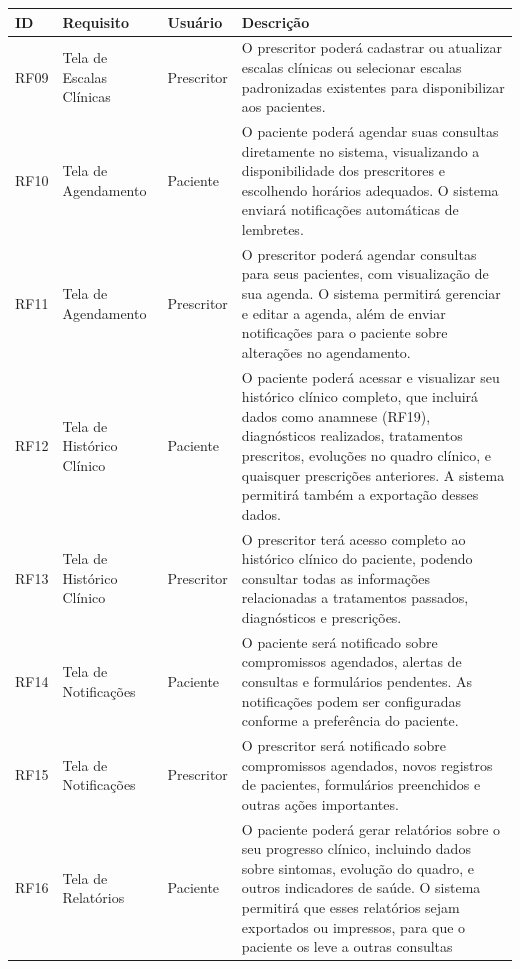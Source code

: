 \href{}{}\documentclass[12pt,portuguese,oneside]{article}
\begin{document}
\begin{table}[H]
\centering
{}
\begin{tabularx}{\textwidth}{|>{\raggedright\arraybackslash}p{1cm}|>{\raggedright\arraybackslash}p{3cm}|>{\raggedright\arraybackslash}p{2cm}|>{\raggedright\arraybackslash}X|}
\hline
\rowcolor{gray!20}
\textbf{ID} & \textbf{Requisito} & \textbf{Usuário} & \textbf{Descrição}\\
\hline
RF09 & Tela de Escalas Clínicas & Prescritor & O prescritor poderá cadastrar ou atualizar escalas clínicas ou selecionar escalas padronizadas existentes para disponibilizar aos pacientes.\\
\hline
RF10 & Tela de Agendamento & Paciente & O paciente poderá agendar suas consultas diretamente no sistema, visualizando a disponibilidade dos prescritores e escolhendo horários adequados. O sistema enviará notificações automáticas de lembretes.\\
\hline
RF11 & Tela de Agendamento & Prescritor & O prescritor poderá agendar consultas para seus pacientes, com visualização de sua agenda. O sistema permitirá gerenciar e editar a agenda, além de enviar notificações para o paciente sobre alterações no agendamento.\\
\hline
RF12 & Tela de Histórico Clínico & Paciente & O paciente poderá acessar e visualizar seu histórico clínico completo, que incluirá dados como anamnese (RF19), diagnósticos realizados, tratamentos prescritos, evoluções no quadro clínico, e quaisquer prescrições anteriores. A sistema permitirá também a exportação desses dados.\\
\hline
RF13 & Tela de Histórico Clínico & Prescritor & O prescritor terá acesso completo ao histórico clínico do paciente, podendo consultar todas as informações relacionadas a tratamentos passados, diagnósticos e prescrições.\\
\hline
RF14 & Tela de Notificações & Paciente & O paciente será notificado sobre compromissos agendados, alertas de consultas e formulários pendentes. As notificações podem ser configuradas conforme a preferência do paciente.\\
\hline
RF15 & Tela de Notificações & Prescritor & O prescritor será notificado sobre compromissos agendados, novos registros de pacientes, formulários preenchidos e outras ações importantes.\\
\hline
RF16 & Tela de Relatórios & Paciente & O paciente poderá gerar relatórios sobre o seu progresso clínico, incluindo dados sobre sintomas, evolução do quadro, e outros indicadores de saúde. O sistema permitirá que esses relatórios sejam exportados ou impressos, para que o paciente os leve a outras consultas\\

\end{tabularx}
\end{table}
\end{document}
